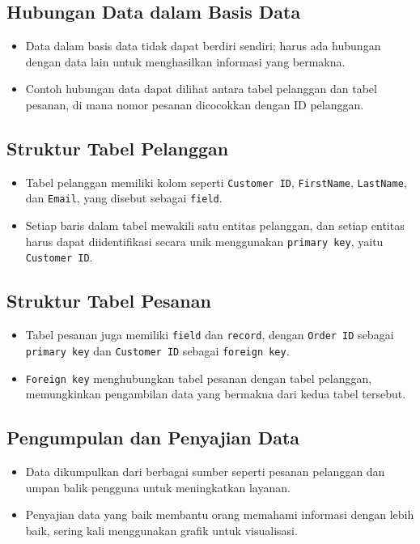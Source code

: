 \documentclass{article}
\begin{document}
\subsection{Hubungan Data dalam Basis Data}
\begin{itemize}
    \item Data dalam basis data tidak dapat berdiri sendiri; harus ada hubungan dengan data lain untuk menghasilkan informasi yang bermakna.
    \item Contoh hubungan data dapat dilihat antara tabel pelanggan dan tabel pesanan, di mana nomor pesanan dicocokkan dengan ID pelanggan.
\end{itemize}

\subsection{Struktur Tabel Pelanggan}
\begin{itemize}
    \item Tabel pelanggan memiliki kolom seperti \texttt{Customer ID}, \texttt{FirstName}, \texttt{LastName}, dan \texttt{Email}, yang disebut sebagai \texttt{field}.
    \item Setiap baris dalam tabel mewakili satu entitas pelanggan, dan setiap entitas harus dapat diidentifikasi secara unik menggunakan \texttt{primary key}, yaitu \texttt{Customer ID}.
\end{itemize}

\subsection{Struktur Tabel Pesanan}
\begin{itemize}
    \item Tabel pesanan juga memiliki \texttt{field} dan \texttt{record}, dengan \texttt{Order ID} sebagai \texttt{primary key} dan \texttt{Customer ID} sebagai \texttt{foreign key}.
    \item \texttt{Foreign key} menghubungkan tabel pesanan dengan tabel pelanggan, memungkinkan pengambilan data yang bermakna dari kedua tabel tersebut.
\end{itemize}

\subsection{Pengumpulan dan Penyajian Data}
\begin{itemize}
    \item Data dikumpulkan dari berbagai sumber seperti pesanan pelanggan dan umpan balik pengguna untuk meningkatkan layanan.
    \item Penyajian data yang baik membantu orang memahami informasi dengan lebih baik, sering kali menggunakan grafik untuk visualisasi.
\end{itemize}
\end{document}

